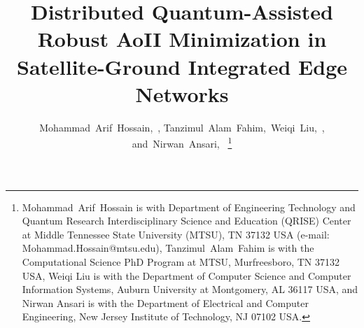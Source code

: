 \documentclass[journal,comsoc]{IEEEtran}
\begin{document}
\title{Distributed Quantum-Assisted Robust AoII Minimization in Satellite-Ground Integrated Edge Networks}
\author{Mohammad~Arif~Hossain,~, Tanzimul~Alam~Fahim,~Weiqi~Liu,~, and~Nirwan~Ansari,~%
\thanks{Mohammad~Arif~Hossain is with Department of Engineering Technology and Quantum Research Interdisciplinary Science and Education (QRISE) Center at Middle Tennessee State University (MTSU), TN 37132 USA (e-mail: Mohammad.Hossain@mtsu.edu), Tanzimul~Alam~Fahim is with the Computational Science PhD Program at MTSU, Murfreesboro, TN 37132 USA, Weiqi Liu is with the Department of Computer Science and Computer Information Systems, Auburn University at Montgomery, AL 36117 USA, and Nirwan Ansari is with the Department of Electrical and Computer Engineering, New Jersey Institute of Technology, NJ 07102 USA.}}

\maketitle








\end{document}
